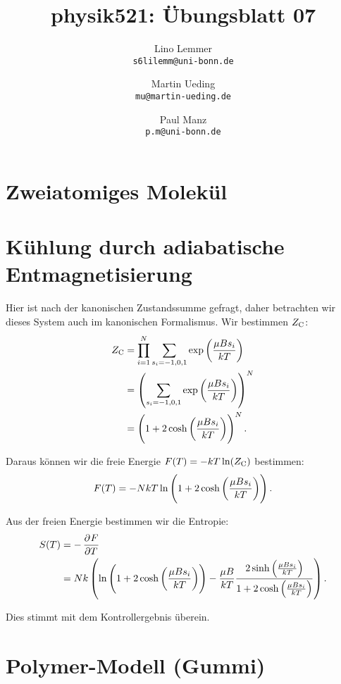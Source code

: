 

\setcounter{section}{0}
\renewcommand\thesection{H\,7.\arabic{section}}
\renewcommand\thesubsection{\thesection.\alph{subsection}}

\title{physik521: Übungsblatt 07}
\author{%
    Lino Lemmer \\ \small{\texttt{s6lilemm@uni-bonn.de}}
    \and
    Martin Ueding \\ \small{\texttt{mu@martin-ueding.de}}
    \and
    Paul Manz \\ \small{\texttt{p.m@uni-bonn.de}}
}


\maketitle
\section{Zweiatomiges Molekül}

\section{Kühlung durch adiabatische Entmagnetisierung}

Hier ist nach der kanonischen Zustandssumme gefragt, daher betrachten wir dieses System auch im kanonischen Formalismus. Wir bestimmen $Z_\text C$:
\begin{align*}
    Z_\text C
    &= \prod_{i=1}^N \sum_{s_i = -1, 0, 1} \exp\del{\frac{\mu B s_i}{k T}} \\
    &= \del{\sum_{s_i = -1, 0, 1} \exp\del{\frac{\mu B s_i}{k T}}}^N \\
    &= \del{1 + 2 \cosh\del{\frac{\mu B s_i}{k T}}}^N.
\end{align*}

Daraus können wir die freie Energie $F(T) = - k T \ln(Z_\text C)$ bestimmen:
\[
    F(T) = - N k T \ln\del{1 + 2 \cosh\del{\frac{\mu B s_i}{k T}}}.
\]

Aus der freien Energie bestimmen wir die Entropie:
\begin{align*}
    S(T)
    &= - \dpd FT \\
    &= N k \del{
        \ln\del{1 + 2 \cosh\del{\frac{\mu B s_i}{k T}}}
        - \frac{\mu B}{kT} \frac{2 \sinh\del{\frac{\mu B s_i}{k T}}}{1 + 2\cosh\del{\frac{\mu B s_i}{k T}}}
    }.
\end{align*}

Dies stimmt mit dem Kontrollergebnis überein.

\section{Polymer-Modell (Gummi)}


